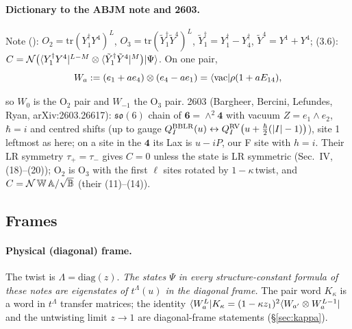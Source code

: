 \paragraph{Dictionary to the ABJM note and 2603.} Note (): $O_2=\mathrm{tr}(Y_1^\dagger Y^4)^L$,
$O_3=\mathrm{tr}(\tilde Y_1^\dagger\tilde Y^4)^L$, $\tilde Y_1^\dagger=Y_1^\dagger-Y_4^\dagger$, $\tilde Y^4=Y^1+Y^4$;
(3.6): $C=\mathcal N\big(\langle Y_1^\dagger Y^4|^{L-M}\otimes\langle\tilde Y_1^\dagger\tilde Y^4|^{M}\big)|\Psi\rangle$. On one pair,
\begin{equation}
 W_a:=(e_1+ae_4)\otimes(e_4-ae_1)=\langle\mathrm{vac}|\rho(1+aE_{14}),
\end{equation}
{\raggedright so $W_0$ is the O$_2$ pair and $W_{-1}$ the O$_3$ pair. 2603 (Bargheer, Bercini, Lefundes, Ryan, arXiv:2603.26617):
$\mathfrak{so}(6)$ chain of $\mathbf 6=\wedge^2\mathbf4$ with vacuum $Z=e_1\wedge e_2$, $\hbar=i$ and centred shifts
(up to gauge $Q^{\rm BBLR}_I(u)\leftrightarrow Q^{\rm RV}_I\big(u+\tfrac\hbar2(|I|-1)\big)$), site 1 leftmost as here; on a
site in the $\mathbf4$ its Lax is $u-iP$, our F site with $h=i$. Their LR symmetry $\tau_+=\tau_-$ gives $C=0$ unless the state is LR
symmetric (Sec.~IV, (18)--(20)); O$_2$ is O$_3$ with the first $\ell$ sites rotated by $1-\kappa\,$twist, and
$C=\mathcal N\,\mathbb W\,\mathbb A/\sqrt{\mathbb B}$ (their (11)--(14)).\par}

\subsection{Frames}\label{sec:conv-frames}

\paragraph{Physical (diagonal) frame.} The twist is $\Lambda=\mathrm{diag}(z)$.
\emph{The states $\Psi$ in every structure-constant formula of these notes are eigenstates of $t^\Lambda(u)$ in the diagonal
frame.} The pair word $K_\kappa$ is a word in $t^\Lambda$ transfer matrices; the identity
$\langle W_a^L|K_\kappa=(1-\kappa z_1)^2\langle W_{a'}\otimes W_a^{L-1}|$ and the untwisting limit $z\to1$ are diagonal-frame
statements (\S\ref{sec:kappa}).

